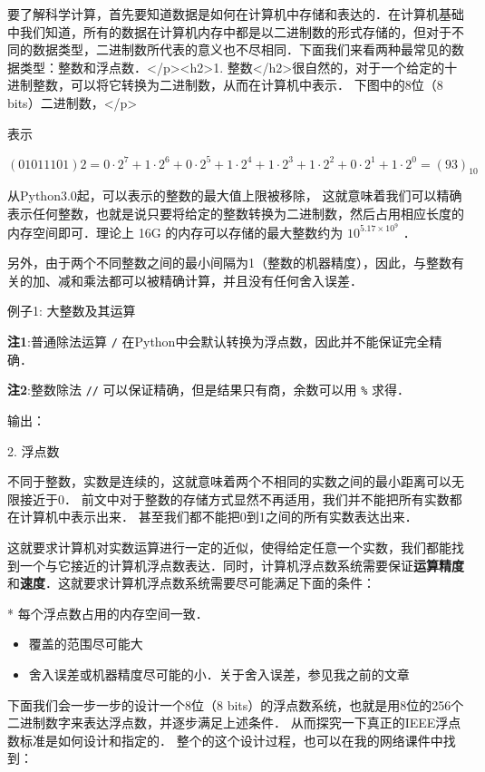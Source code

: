 
\begin{issues}
\issueDraft
\end{issues}


要了解科学计算，首先要知道数据是如何在计算机中存储和表达的．在计算机基础中我们知道，所有的数据在计算机内存中都是以二进制数的形式存储的，但对于不同的数据类型，二进制数所代表的意义也不尽相同．下面我们来看两种最常见的数据类型：整数和浮点数．</p><h2>1. 整数</h2>很自然的，对于一个给定的十进制整数，可以将它转换为二进制数，从而在计算机中表示． 下图中的8位（8 bits）二进制数，</p>

表示

 $(01011101)2=0\cdot2^7+1\cdot2^6+0\cdot2^5+1\cdot2^4+1\cdot2^3+1\cdot2^2+0\cdot2^1+1\cdot2^0=(93)_{10}$  

从Python3.0起，可以表示的整数的最大值上限被移除， 这就意味着我们可以精确表示任何整数，也就是说只要将给定的整数转换为二进制数，然后占用相应长度的内存空间即可．理论上 16G 的内存可以存储的最大整数约为  $10^{5.17\times10^9}$  ．

另外，由于两个不同整数之间的最小间隔为1（整数的机器精度），因此，与整数有关的加、减和乘法都可以被精确计算，并且没有任何舍入误差．

例子1: 大整数及其运算

\textbf{注1}:普通除法运算  \verb|/|  在Python中会默认转换为浮点数，因此并不能保证完全精确．

\textbf{注2}:整数除法 \verb|//| 可以保证精确，但是结果只有商，余数可以用 \verb|%|  求得．

输出：

2. 浮点数

不同于整数，实数是连续的，这就意味着两个不相同的实数之间的最小距离可以无限接近于0． 前文中对于整数的存储方式显然不再适用，我们并不能把所有实数都在计算机中表示出来． 甚至我们都不能把0到1之间的所有实数表达出来．

这就要求计算机对实数运算进行一定的近似，使得给定任意一个实数，我们都能找到一个与它接近的计算机浮点数表达．同时，计算机浮点数系统需要保证\textbf{运算精度}和\textbf{速度}．这就要求计算机浮点数系统需要尽可能满足下面的条件：

* 每个浮点数占用的内存空间一致．

\begin{itemize}
\item 覆盖的范围尽可能大
\item 舍入误差或机器精度尽可能的小．关于舍入误差，参见我之前的文章
\end{itemize}

下面我们会一步一步的设计一个8位（8 bits）的浮点数系统，也就是用8位的256个二进制数字来表达浮点数，并逐步满足上述条件． 从而探究一下真正的IEEE浮点数标准是如何设计和指定的． 整个的这个设计过程，也可以在我的网络课件中找到：

